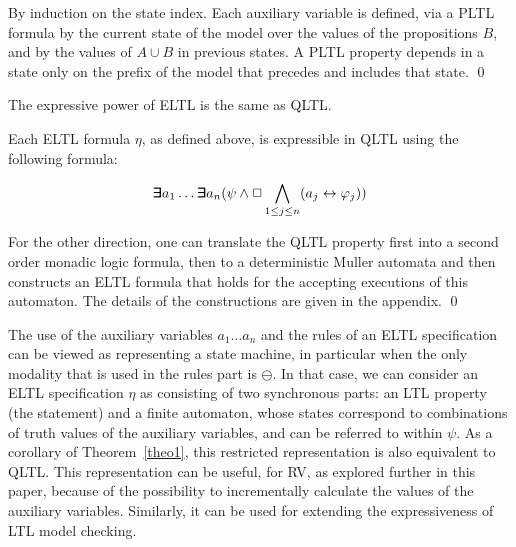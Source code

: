 
 By induction on the state index. Each auxiliary variable
is defined, via a PLTL formula by the current state of the model over the values of the propositions $B$, and by the values of $A \cup B$ in previous states. A PLTL
property depends in a state only on the prefix
of the model that precedes and includes that state. \qed


\begin{theorem}
\label{theo1}
The expressive power of 
ELTL is the same as QLTL.
\end{theorem}
Each ELTL formula $\eta$, as defined above,
is expressible in QLTL using the following formula:

\[   \bm{\exists}\kern-0.6em\bm{\exists} a_1 \ldots \bm{\exists}\kern-0.6em\bm{\exists} a_n  ( \psi  \wedge   \Box \bigwedge_{1 \leq j \leq n} ( a_j \leftrightarrow \varphi_j))
\]


For the other direction, one can translate the QLTL property first into
a second order monadic logic formula, then to a deterministic Muller automata and then constructs an ELTL formula that holds for the accepting executions of this automaton. The details of the
constructions are given in the appendix. \qed


\iffalse
The use of the auxiliary variables $a_1 \ldots a_n$ and the
rules of an ELTL specification 
can be viewed as representing a
state machine, in particular when the only modality that is used in the rules part is $\ominus$.
In that case, we can consider an ELTL specification $\eta$ as consisting of two synchronous parts: an LTL property 
(the statement) 
and a finite automaton, whose states correspond to combinations
of truth values of the auxiliary variables, and can be referred to
within $\psi$. As a corollary of Theorem~\ref{theo1}, 
this restricted representation is also equivalent to QLTL.
This representation can be useful, for RV, as explored further in this paper, because of the possibility to
incrementally calculate the values of the auxiliary variables. 
Similarly, it can be
used for extending the expressiveness of LTL model checking.


